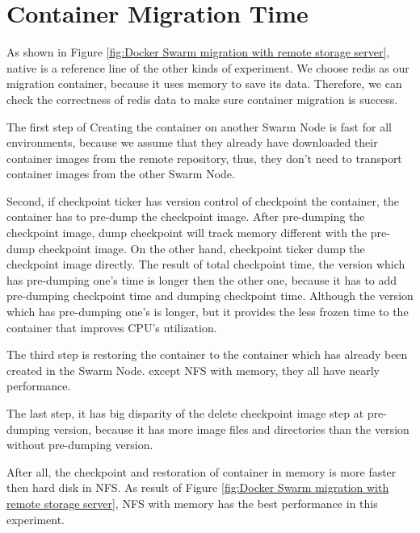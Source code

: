 \section{Container Migration Time}
As shown in Figure \ref{fig:Docker Swarm migration with remote storage server}, native is a reference line of the other kinds of experiment. We choose redis\cite{paksula2010persisting} as our migration container, because it uses memory to save its data. Therefore, we can check the correctness of redis data to make sure container migration is success.

The first step of Creating the container on another Swarm Node is fast for all environments, because we assume that they already have downloaded their container images from the remote repository, thus, they don't need to transport container images from the other Swarm Node.

Second, if checkpoint ticker has version control of checkpoint the container, the container has to pre-dump the checkpoint image. After pre-dumping the checkpoint image, dump checkpoint will track memory different with the pre-dump checkpoint image. On the other hand, checkpoint ticker dump the checkpoint image directly. The result of total checkpoint time, the version which has pre-dumping one's time is longer then the other one, because it has to add pre-dumping checkpoint time and dumping checkpoint time. Although the version which has pre-dumping one's is longer, but it provides the less frozen time to the container that improves CPU's utilization.

The third step is restoring the container to the container which has already been created in the Swarm Node. except NFS with memory, they all have nearly performance.

The last step, it has big disparity of the delete checkpoint image step at pre-dumping version, because it has more image files and directories than the version without pre-dumping version.

After all, the checkpoint and restoration of container in memory is more faster then hard disk in NFS. As result of Figure \ref{fig:Docker Swarm migration with remote storage server}, NFS with memory has the best performance in this experiment.

